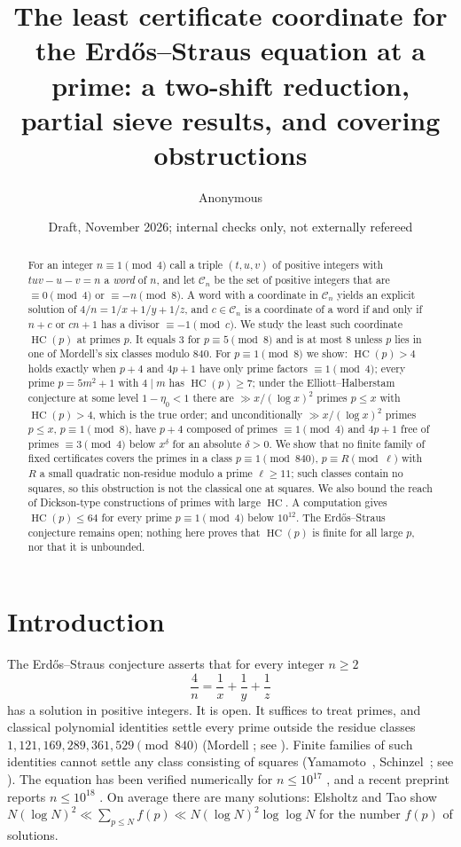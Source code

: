 \documentclass[11pt,reqno]{amsart}
\title[The least certificate coordinate for Erd\H{o}s--Straus]{The least
certificate coordinate for the Erd\H{o}s--Straus equation at a prime:
a two-shift reduction, partial sieve results, and covering obstructions}
\author{Anonymous}
\date{Draft, November 2026; internal checks only, not externally refereed}
\theoremstyle{definition}
\newcommand{\cC}{\mathcal C}
\newcommand{\HC}{\operatorname{HC}}
\begin{document}
\begin{abstract}
For an integer $n\equiv1\pmod 4$ call a triple $(t,u,v)$ of positive
integers with $tuv-u-v=n$ a \emph{word} of $n$, and let $\cC_n$ be the set
of positive integers that are $\equiv0\pmod4$ or $\equiv-n\pmod8$.  A word
with a coordinate in $\cC_n$ yields an explicit solution of
$4/n=1/x+1/y+1/z$, and $c\in\cC_n$ is a coordinate of a word if and only if
$n+c$ or $cn+1$ has a divisor $\equiv-1\pmod c$.  We study the least such
coordinate $\HC(p)$ at primes $p$.  It equals $3$ for $p\equiv5\pmod8$
and is at most $8$ unless $p$ lies in one of Mordell's six classes modulo
$840$.  For $p\equiv1\pmod8$ we show: $\HC(p)>4$ holds exactly when $p+4$
and $4p+1$ have only prime factors $\equiv1\pmod4$; every prime
$p=5m^2+1$ with $4\mid m$ has $\HC(p)\ge7$; under the Elliott--Halberstam
conjecture at some level $1-\eta_0<1$ there are $\gg x/(\log x)^2$ primes
$p\le x$ with $\HC(p)>4$, which is the true order; and unconditionally
$\gg x/(\log x)^2$ primes $p\le x$, $p\equiv1\pmod 8$, have $p+4$ composed
of primes $\equiv1\pmod4$ and $4p+1$ free of primes $\equiv3\pmod4$ below
$x^{\delta}$ for an absolute $\delta>0$.  We show that no finite family of
fixed certificates covers the primes in a class
$p\equiv1\pmod{840}$, $p\equiv R\pmod\ell$ with $R$ a small quadratic
non-residue modulo a prime $\ell\ge11$; such classes contain no squares,
so this obstruction is not the classical one at squares.  We also bound
the reach of Dickson-type constructions of primes with large $\HC$.  A
computation gives $\HC(p)\le64$ for every prime $p\equiv1\pmod4$ below
$10^{12}$.  The Erd\H{o}s--Straus conjecture remains open; nothing here
proves that $\HC(p)$ is finite for all large $p$, nor that it is unbounded.
\end{abstract}
\maketitle

\section{Introduction}\label{sec:intro}

The Erd\H{o}s--Straus conjecture asserts that for every integer $n\ge2$
\begin{equation}\label{eq:ES}
\frac4n=\frac1x+\frac1y+\frac1z
\end{equation}
has a solution in positive integers.  It is open.  It suffices to treat
primes, and classical polynomial identities settle every prime outside
the residue classes $1,121,169,289,361,529\pmod{840}$ (Mordell
\cite{Mordell}; see \cite[p.~8]{ET}).  Finite families of such identities
cannot settle any class consisting of squares
(Yamamoto~\cite{Yamamoto}, Schinzel~\cite{Schinzel}; see
\cite[Prop.~1.6 and the discussion before Prop.~1.9]{ET}).  The equation
has been verified numerically for $n\le10^{17}$ \cite{Salez}, and a recent
preprint reports $n\le10^{18}$ \cite{MD}.  On average there are many
solutions: Elsholtz and Tao \cite[Thm.~1.1]{ET} show
$N(\log N)^2\ll\sum_{p\le N}f(p)\ll N(\log N)^2\log\log N$ for the number
$f(p)$ of solutions.
\end{document}
